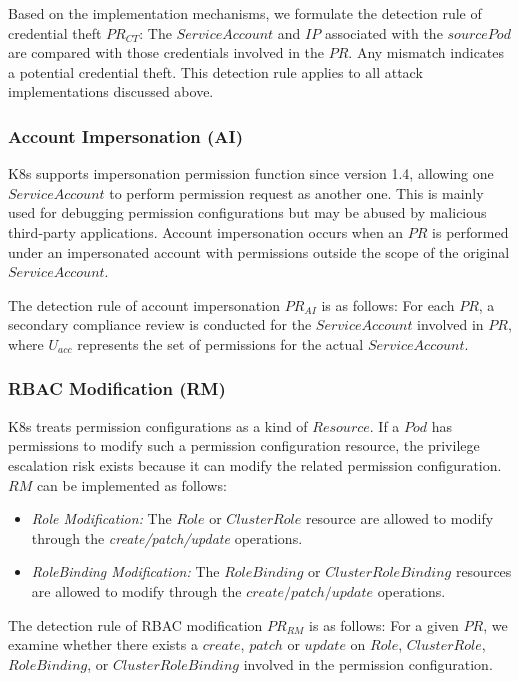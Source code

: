 \documentclass[conference]{IEEEtran}
\theoremstyle{definition}
\begin{document}
Based on the implementation mechanisms, we formulate the detection rule of credential theft $PR_{CT}$: The $ServiceAccount$ and $IP$ associated with the $sourcePod$ are compared with those credentials involved in the $PR$. Any mismatch indicates a potential credential theft. This detection rule applies to all attack implementations discussed above.

\subsubsection{Account Impersonation (AI)}
K8s supports impersonation permission function since version 1.4, allowing one $ServiceAccount$ to perform permission request as another one. This is mainly used for debugging permission configurations but may be abused by malicious third-party applications. Account impersonation occurs when an $PR$ is performed under an impersonated account with permissions outside the scope of the original $ServiceAccount$. 

The detection rule of account impersonation $PR_{AI}$ is as follows: For each $PR$, a secondary compliance review is conducted for the $ServiceAccount$ involved in $PR$, where $U_{acc}$ represents the set of permissions for the actual $ServiceAccount$. 

\subsubsection{RBAC Modification (RM)}
K8s treats permission configurations as a kind of $Resource$. If a $Pod$ has permissions to modify such a permission configuration resource, the privilege escalation risk exists because it can modify the related permission configuration. $RM$ can be implemented as follows:
\begin{itemize}
  \item \textit{Role Modification:} The $Role$ or $ClusterRole$ resource are allowed to modify through the \textit{create/patch/update} operations.  
  \item \textit{RoleBinding Modification:} The $RoleBinding$ or $ClusterRoleBinding$ resources are allowed to modify through the $create/patch/update$ operations.
\end{itemize}

The detection rule of RBAC modification $PR_{RM}$ is as follows: For a given $PR$, we examine whether there exists a $create$, $patch$ or $update$ on $Role$, $ClusterRole$, $RoleBinding$, or $ClusterRoleBinding$ involved in the permission configuration. 
\end{document}
